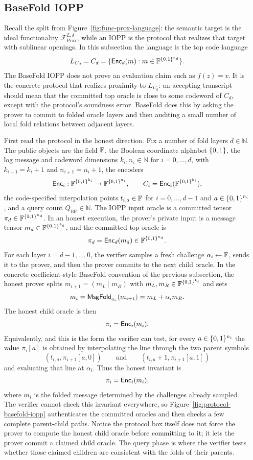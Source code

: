 \subsection{BaseFold IOPP}

Recall the split from Figure~\ref{fig:func-prox-language}: the semantic target
is the ideal functionality \(\mathcal F_{\mathrm{Prox}}^{L,\delta}\), while an
IOPP is the protocol that realizes that target with sublinear openings.  In
this subsection the language is the top code language
\[
  L_{C_d}=C_d=\{\mathsf{Enc}_d(m):m\in\mathbb{F}^{\{0,1\}^{k_d}}\}.
\]
The BaseFold IOPP does not prove an evaluation claim such as \(f(z)=v\).  It is
the concrete protocol that realizes proximity to \(L_{C_d}\): an accepting
transcript should mean that the committed top oracle is close to some codeword
of \(C_d\), except with the protocol's soundness error.  BaseFold does this by
asking the prover to commit to folded oracle layers and then auditing a small
number of local fold relations between adjacent layers.

First read the protocol in the honest direction.  Fix a number of fold layers
$d\in\mathbb{N}$.  The public objects are the field $\mathbb{F}$, the Boolean coordinate
alphabet $\{0,1\}$, the log message and codeword dimensions
$k_i,n_i\in\mathbb{N}$ for $i=0,\ldots,d$, with
$k_{i+1}=k_i+1$ and $n_{i+1}=n_i+1$, the encoders
\[
  \mathsf{Enc}_i:\mathbb{F}^{\{0,1\}^{k_i}}\to\mathbb{F}^{\{0,1\}^{n_i}},
  \qquad
  C_i=\mathsf{Enc}_i(\mathbb{F}^{\{0,1\}^{k_i}}),
\]
the code-specified interpolation points $t_{i,a}\in\mathbb{F}$ for
$i=0,\ldots,d-1$ and $a\in\{0,1\}^{n_i}$, and a query count
$Q_{\mathrm{BF}}\in\mathbb{N}$.  The IOPP input oracle is a committed tensor
$\pi_d\in\mathbb{F}^{\{0,1\}^{n_d}}$.  In an honest execution, the prover's private input is
a message tensor $m_d\in\mathbb{F}^{\{0,1\}^{k_d}}$, and the committed top oracle is
\[
  \pi_d=\mathsf{Enc}_d(m_d)\in\mathbb{F}^{\{0,1\}^{n_d}}.
\]
For each layer $i=d-1,\ldots,0$, the verifier samples a fresh challenge
$\alpha_i\leftarrow\mathbb{F}$, sends it to the prover, and then the prover commits to
the next child oracle.  In
the concrete coefficient-style BaseFold convention of the previous subsection,
the honest prover splits $m_{i+1}=(m_L\mid m_R)$ with
$m_L,m_R\in\mathbb{F}^{\{0,1\}^{k_i}}$ and sets
\[
  m_i=\mathsf{MsgFold}_{\alpha_i}(m_{i+1})=m_L+\alpha_i m_R.
\]
The honest child oracle is then
\[
  \pi_i=\mathsf{Enc}_i(m_i).
\]
Equivalently, and this is the form the verifier can test, for every
$a\in\{0,1\}^{n_i}$ the value $\pi_i[a]$ is obtained by interpolating the line through
the two parent symbols
\[
  (t_{i,a},\pi_{i+1}[a,0])
  \qquad\text{and}\qquad
  (t_{i,a}+1,\pi_{i+1}[a,1])
\]
and evaluating that line at $\alpha_i$.  Thus the honest invariant is
\[
  \pi_i=\mathsf{Enc}_i(m_i),
\]
where $m_i$ is the folded message determined by the challenges already sampled.
The verifier cannot check this invariant everywhere, so
Figure~\ref{fig:protocol-basefold-iopp} authenticates the committed oracles and
then checks a few complete parent-child paths.  Notice the protocol box itself
does not force the prover to compute the honest child oracle before committing
to it; it lets the prover commit a claimed child oracle.  The query phase is
where the verifier tests whether those claimed children are consistent with the
folds of their parents.

